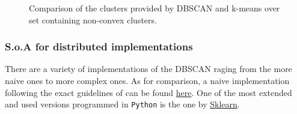 \documentclass[10pt,journal,compsoc]{IEEEtran}
\let\MYoriglatexcaption\caption
\renewcommand{\caption}[2][\relax]{\MYoriglatexcaption[#2]{#2}}
\begin{document}
\begin{figure}[!t]
\centering
{}
\hfil
{}
\caption{Comparison of the clusters provided by DBSCAN and k-means over set containing non-convex clusters.}
\label{fig_comp_clust}
\end{figure}

\subsubsection{S.o.A for distributed implementations}

There are a variety of implementations of the DBSCAN raging from the more naive ones to more complex ones. As for comparison, a naive implementation following the exact guidelines of \cite{ReferencePaper} can be found \href{https://github.com/csegarragonz/DBSCAN-pyCOMPSs/blob/master/ext_versions/DBSCAN_Seq.py}{here}. One of the most extended and used versions programmed in \texttt{Python} is the one by \href{http://scikit-learn.org/stable/modules/generated/sklearn.cluster.DBSCAN.html}{Sklearn}.
\end{document}
